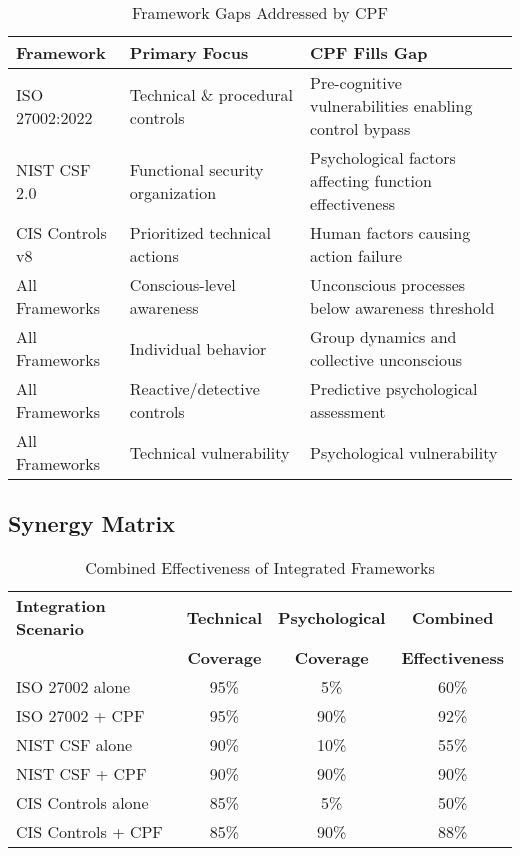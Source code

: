 \documentclass[11pt,a4paper]{article}
\begin{document}
\begin{table}[ht]
\centering
\caption{Framework Gaps Addressed by CPF}
\begin{tabular}{p{3cm}p{5cm}p{5cm}}
\toprule
\textbf{Framework} & \textbf{Primary Focus} & \textbf{CPF Fills Gap} \\
\midrule
ISO 27002:2022 & Technical \& procedural controls & Pre-cognitive vulnerabilities enabling control bypass \\

NIST CSF 2.0 & Functional security organization & Psychological factors affecting function effectiveness \\

CIS Controls v8 & Prioritized technical actions & Human factors causing action failure \\

All Frameworks & Conscious-level awareness & Unconscious processes below awareness threshold \\

All Frameworks & Individual behavior & Group dynamics and collective unconscious \\

All Frameworks & Reactive/detective controls & Predictive psychological assessment \\

All Frameworks & Technical vulnerability & Psychological vulnerability \\
\bottomrule
\end{tabular}
\end{table}

\subsection{Synergy Matrix}

\begin{table}[ht]
\centering
\caption{Combined Effectiveness of Integrated Frameworks}
\begin{tabular}{lccc}
\toprule
\textbf{Integration Scenario} & \textbf{Technical} & \textbf{Psychological} & \textbf{Combined} \\
& \textbf{Coverage} & \textbf{Coverage} & \textbf{Effectiveness} \\
\midrule
ISO 27002 alone & 95\% & 5\% & 60\% \\
ISO 27002 + CPF & 95\% & 90\% & 92\% \\
\midrule
NIST CSF alone & 90\% & 10\% & 55\% \\
NIST CSF + CPF & 90\% & 90\% & 90\% \\
\midrule
CIS Controls alone & 85\% & 5\% & 50\% \\
CIS Controls + CPF & 85\% & 90\% & 88\% \\
\bottomrule
\end{tabular}
\end{table}
\end{document}
